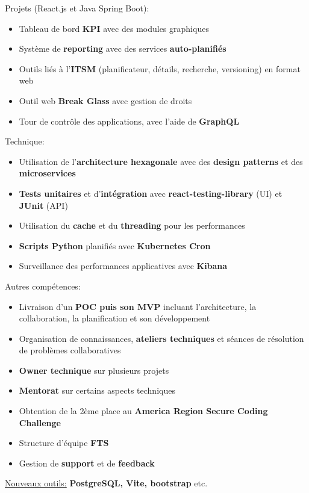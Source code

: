 \documentclass[10pt,a4paper,ragged2e,withhyper]{altacv}
\begin{document}
\vspace{-.5\baselineskip}
\begin{minipage}[t]{0.45\textwidth}
  \vspace{0pt}
  Projets (React.js et Java Spring Boot):
  \begin{itemize}
    \item Tableau de bord \textbf{KPI} avec des modules graphiques
    \item Système de \textbf{reporting} avec des services \textbf{auto-planifiés}
    \item Outils liés à l'\textbf{ITSM} (planificateur, détails, recherche, versioning) en format web
    \item Outil web \textbf{Break Glass} avec gestion de droits
    \item Tour de contrôle des applications, avec l'aide de \textbf{GraphQL}
  \end{itemize}
\end{minipage}
\hfill
\begin{minipage}[t]{0.45\textwidth}
  \vspace{0pt}
  Technique:
  \begin{itemize}
    \item Utilisation de l'\textbf{architecture hexagonale} avec des \textbf{design patterns} et des \textbf{microservices}
    \item \textbf{Tests unitaires} et d'\textbf{intégration} avec \textbf{react-testing-library} (UI) et \textbf{JUnit} (API)
    \item Utilisation du \textbf{cache} et du \textbf{threading} pour les performances
    \item \textbf{Scripts Python} planifiés avec \textbf{Kubernetes Cron}
    \item Surveillance des performances applicatives avec \textbf{Kibana}
  \end{itemize}
\end{minipage}
\medskip

Autres compétences:
\begin{itemize}
  \item Livraison d'un \textbf{POC puis son MVP} incluant l'architecture, la collaboration, la planification et son développement
  \item Organisation de connaissances, \textbf{ateliers techniques} et séances de résolution de problèmes collaboratives
  \item \textbf{Owner technique} sur plusieurs projets
  \item \textbf{Mentorat} sur certains aspects techniques
  \item Obtention de la 2ème place au \textbf{America Region Secure Coding Challenge}
  \item Structure d'équipe \textbf{FTS}
  \item Gestion de \textbf{support} et de \textbf{feedback}
\end{itemize}
\begin{itshape}
  \underline{Nouveaux outils:}
  \small{\textbf{PostgreSQL, Vite, bootstrap} etc.}
\end{itshape}
\end{document}
